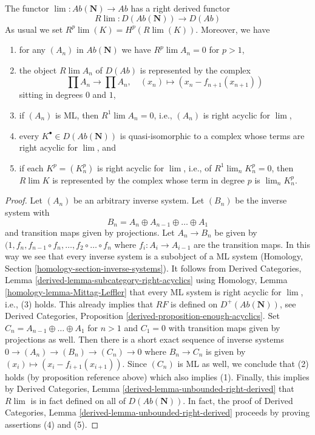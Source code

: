 \begin{lemma}
\label{lemma-compute-Rlim}
The functor $\lim : \textit{Ab}(\mathbf{N}) \to \textit{Ab}$
has a right derived functor
\begin{equation}
\label{equation-Rlim}
R\lim : D(\textit{Ab}(\mathbf{N})) \longrightarrow D(\textit{Ab})
\end{equation}
As usual we set $R^p\lim(K) = H^p(R\lim(K))$. Moreover, we have
\begin{enumerate}
\item for any $(A_n)$ in $\textit{Ab}(\mathbf{N})$ we have
$R^p\lim A_n = 0$ for $p > 1$,
\item the object $R\lim A_n$ of $D(\textit{Ab})$ is represented
by the complex
$$
\prod A_n \to \prod A_n,\quad (x_n) \mapsto (x_n - f_{n + 1}(x_{n + 1}))
$$
sitting in degrees $0$ and $1$,
\item if $(A_n)$ is ML, then $R^1\lim A_n = 0$, i.e., $(A_n)$
is right acyclic for $\lim$,
\item every $K^\bullet \in D(\textit{Ab}(\mathbf{N}))$ is quasi-isomorphic
to a complex whose terms are right acyclic for $\lim$, and
\item if each $K^p = (K^p_n)$ is right acyclic for $\lim$, i.e.,
of $R^1\lim_n K^p_n = 0$, then $R\lim K$ is represented by the
complex whose term in degree $p$ is $\lim_n K_n^p$.
\end{enumerate}
\end{lemma}

\begin{proof}
Let $(A_n)$ be an arbitrary inverse system. Let $(B_n)$ be the inverse
system with
$$
B_n = A_n \oplus A_{n - 1} \oplus \ldots \oplus A_1
$$
and transition maps given by projections. Let $A_n \to B_n$ be given
by $(1, f_n, f_{n - 1} \circ f_n, \ldots, f_2 \circ \ldots \circ f_n$
where $f_i : A_i \to A_{i - 1}$ are the transition maps.
In this way we see that every inverse system is a subobject of a
ML system (Homology, Section \ref{homology-section-inverse-systems}).
It follows from
Derived Categories, Lemma \ref{derived-lemma-subcategory-right-acyclics}
using Homology, Lemma \ref{homology-lemma-Mittag-Leffler}
that every ML system is right acyclic for $\lim$, i.e., (3) holds.
This already implies that $RF$ is defined on $D^+(\textit{Ab}(\mathbf{N}))$,
see Derived Categories, Proposition \ref{derived-proposition-enough-acyclics}.
Set $C_n = A_{n - 1} \oplus \ldots \oplus A_1$ for $n > 1$ and
$C_1 = 0$ with transition maps given by projections as well.
Then there is a short exact sequence of inverse systems
$0 \to (A_n) \to (B_n) \to (C_n) \to 0$ where $B_n \to C_n$
is given by $(x_i) \mapsto (x_i - f_{i + 1}(x_{i + 1}))$.
Since $(C_n)$ is ML as well, we conclude that (2) holds
(by proposition reference above) which also implies (1).
Finally, this implies by Derived Categories, Lemma
\ref{derived-lemma-unbounded-right-derived}
that $R\lim$ is in fact defined on all of $D(\textit{Ab}(\mathbf{N}))$.
In fact, the proof of Derived Categories, Lemma
\ref{derived-lemma-unbounded-right-derived}
proceeds by proving assertions (4) and (5).
\end{proof}


